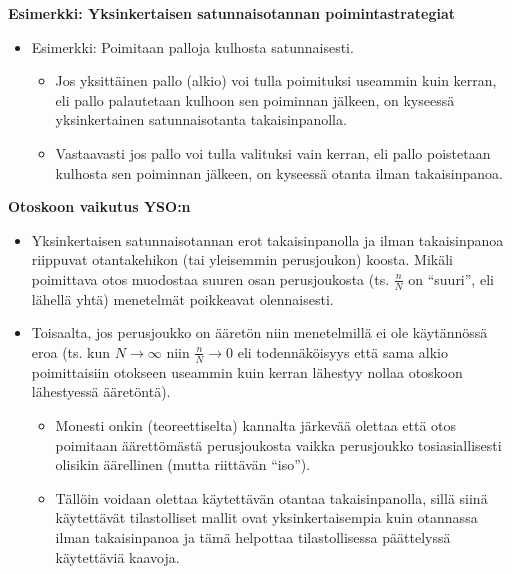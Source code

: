 \documentclass[
]{book}
\providecommand{\tightlist}{%
  \setlength{\itemsep}{0pt}\setlength{\parskip}{0pt}}
\begin{document}
\begin{eblock}{}

\textbf{Esimerkki: Yksinkertaisen satunnaisotannan poimintastrategiat}

\begin{itemize}
\tightlist
\item
  Esimerkki: Poimitaan palloja kulhosta satunnaisesti.

  \begin{itemize}
  \tightlist
  \item
    Jos yksittäinen pallo (alkio) voi tulla poimituksi useammin kuin kerran, eli pallo palautetaan kulhoon sen poiminnan jälkeen, on kyseessä yksinkertainen satunnaisotanta takaisinpanolla.
  \item
    Vastaavasti jos pallo voi tulla valituksi vain kerran, eli pallo poistetaan kulhosta sen poiminnan jälkeen, on kyseessä otanta ilman takaisinpanoa.
  \end{itemize}
\end{itemize}

\end{eblock}

\textbf{Otoskoon vaikutus YSO:n}

\begin{itemize}
\tightlist
\item
  Yksinkertaisen satunnaisotannan erot takaisinpanolla ja ilman takaisinpanoa riippuvat otantakehikon (tai yleisemmin perusjoukon) koosta. Mikäli poimittava otos muodostaa suuren osan perusjoukosta (ts. \(\frac{n}{N}\) on ``suuri'', eli lähellä yhtä) menetelmät poikkeavat olennaisesti.
\item
  Toisaalta, jos perusjoukko on ääretön niin menetelmillä ei ole käytännössä eroa (ts. kun \(N \longrightarrow \infty\) niin \(\frac{n}{N} \longrightarrow 0\) eli todennäköisyys että sama alkio poimittaisiin otokseen useammin kuin kerran lähestyy nollaa otoskoon lähestyessä ääretöntä).

  \begin{itemize}
  \tightlist
  \item
    Monesti onkin (teoreettiselta) kannalta järkevää olettaa että otos poimitaan äärettömästä perusjoukosta vaikka perusjoukko tosiasiallisesti olisikin äärellinen (mutta riittävän ``iso'').
  \item
    Tällöin voidaan olettaa käytettävän otantaa takaisinpanolla, sillä siinä käytettävät tilastolliset mallit ovat yksinkertaisempia kuin otannassa ilman takaisinpanoa ja tämä helpottaa tilastollisessa päättelyssä käytettäviä kaavoja.
  \end{itemize}
\end{itemize}
\end{document}
